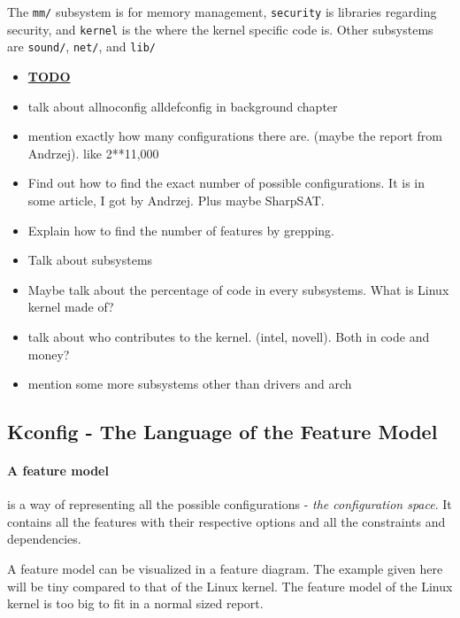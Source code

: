 \documentclass[a4paper,11pt]{report}
\newcommand{\figa}{
    \begin{figure}[!htpb]
    \centering
}
\newcommand{\figb}[2]{
    \caption{#1}
    \label{#2}
    \end{figure}
}
\begin{document}
The \texttt{mm/} subsystem is for memory management, \texttt{security} is 
libraries regarding security, and \texttt{kernel} is the where the kernel 
specific code is. Other subsystems are \texttt{sound/}, \texttt{net/}, and 
\texttt{lib/}



\begin{itemize}
    \item \underline{\textbf{TODO}}
    \item talk about allnoconfig alldefconfig in background chapter
    \item mention exactly how many configurations there are. (maybe the report 
        from Andrzej). like 2**11,000
    \item Find out how to find the exact number of possible configurations. It 
        is in some article, I got by Andrzej. Plus maybe SharpSAT.
    \item Explain how to find the number of features by grepping.
    \item Talk about subsystems
    \item Maybe talk about the percentage of code in every subsystems. What is 
        Linux kernel made of?
    \item talk about who contributes to the kernel. (intel, novell). Both in 
        code and money?
    \item mention some more subsystems other than drivers and arch
\end{itemize}


        \subsection{Kconfig - The Language of the Feature Model}

            \paragraph{A feature model} 
is a way of representing all the possible configurations - \emph{the 
configuration space}. It contains all the features with their respective 
options and all the constraints and dependencies.

A feature model can be visualized in a feature diagram. The example given here 
will be tiny compared to that of the Linux kernel. The feature model of the 
Linux kernel is too big to fit in a normal sized report.
\end{document}
